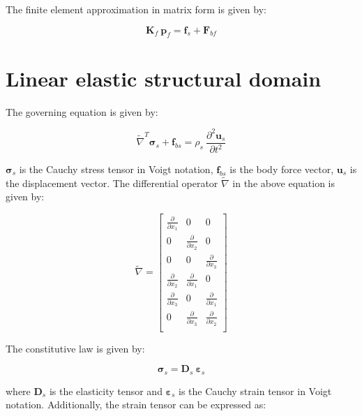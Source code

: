 \documentclass[3p]{elsarticle}
\begin{document}
\noindent The finite element approximation in matrix form is given by:

\begin{equation}
    \label{eqn:Fluid_19}
    \mathbf{K}_f~\mathbf{p}_f = \mathbf{f}_s + \mathbf{F}_{bf}
\end{equation}

\section{Linear elastic structural domain}

\noindent The governing equation is given by:

\begin{equation}
    \label{eqn:Str_1}
    \widetilde{\nabla}^T \pmb{\sigma}_s + \mathbf{f}_{bs} = \rho_s~\frac{\partial^2\mathbf{u}_s}{\partial t^2}
\end{equation}

\noindent $\pmb{\sigma}_s$ is the Cauchy stress tensor in Voigt notation, $\mathbf{f}_{bs}$ is the body force vector, $\mathbf{u}_s$ is the displacement vector. The differential operator $\widetilde{\nabla}$ in the above equation is given by:

\begin{equation}
    \label{eqn:Str_2}
    \widetilde{\nabla} = \begin{bmatrix}
\frac{\partial}{\partial x_1} & 0 & 0\\
0 & \frac{\partial}{\partial x_2} & 0\\
0 & 0 & \frac{\partial}{\partial x_3}\\
\frac{\partial}{\partial x_2} & \frac{\partial}{\partial x_1} & 0\\
\frac{\partial}{\partial x_3} & 0 & \frac{\partial}{\partial x_1}\\
0 & \frac{\partial}{\partial x_3} & \frac{\partial}{\partial x_2}\\
\end{bmatrix}
\end{equation}

\noindent The constitutive law is given by:

\begin{equation}
    \label{eqn:Str_3}
    \pmb{\sigma}_s = \mathbf{D}_s~\pmb{\varepsilon}_s
\end{equation}

\noindent where $\mathbf{D}_s$ is the elasticity tensor and $\pmb{\varepsilon}_s$ is the Cauchy strain tensor in Voigt notation. Additionally, the strain tensor can be expressed as:
\end{document}
